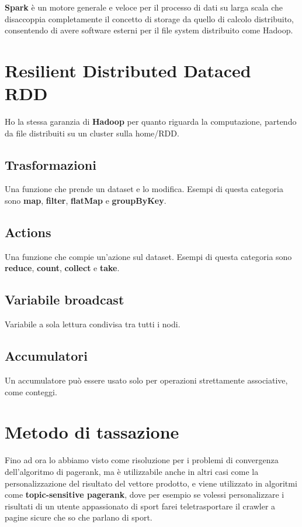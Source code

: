 \providecommand{\main}{..}




\textbf{Spark} è un motore generale e veloce per il processo di dati su larga scala che disaccoppia completamente il concetto di storage da quello di calcolo distribuito, consentendo di avere software esterni per il file system distribuito come Hadoop.

\section{Resilient Distributed Dataced RDD}
Ho la stessa garanzia di \textbf{Hadoop} per quanto riguarda la computazione, partendo da file distribuiti su un cluster sulla home/RDD.

\subsection{Trasformazioni}
Una funzione che prende un dataset e lo modifica. Esempi di questa categoria sono \textbf{map}, \textbf{filter}, \textbf{flatMap} e \textbf{groupByKey}.

\subsection{Actions}
Una funzione che compie un'azione sul dataset. Esempi di questa categoria sono \textbf{reduce}, \textbf{count}, \textbf{collect} e \textbf{take}.

\subsection{Variabile broadcast}
Variabile a sola lettura condivisa tra tutti i nodi.

\subsection{Accumulatori}
Un accumulatore può essere usato solo per operazioni strettamente associative, come conteggi.

\section{Metodo di tassazione}
Fino ad ora lo abbiamo visto come risoluzione per i problemi di convergenza dell'algoritmo di pagerank, ma è utilizzabile anche in altri casi come la personalizzazione del risultato del vettore prodotto, e viene utilizzato in algoritmi come \textbf{topic-sensitive pagerank}, dove per esempio se volessi personalizzare i risultati di un utente appassionato di sport farei teletrasportare il crawler a pagine sicure che so che parlano di sport.

